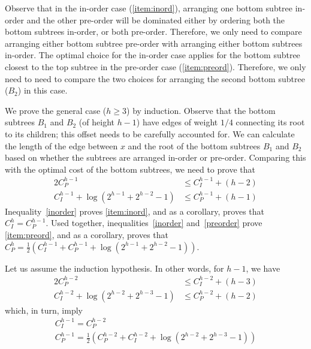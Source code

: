 \documentclass[10pt,conference,letterpaper]{IEEEtran}
\newcommand{\note}[1]{}
\begin{document}
\begin{IEEEproof}
Observe that in the in-order case (\autoref{item:inord}), arranging one bottom subtree in-order and the other pre-order will be dominated either by ordering both the bottom subtrees in-order, or both pre-order. Therefore, we only need to compare arranging either bottom subtree pre-order with arranging either bottom subtrees in-order. The optimal choice for the in-order case applies for the bottom subtree closest to the top subtree in the pre-order case (\autoref{item:preord}). Therefore, we only need to need to compare the two choices for arranging the second bottom subtree ($B_2$) in this case.

\note{I just moved this paragraph ``To prove...'', which wasn't useful in the main text.  Need to work it in somewhere. Worked in at top of the proof}

We prove the general case ($h \geq 3$) by induction. Observe that the bottom subtrees $B_1$ and $B_2$ (of height $h-1$) have edges of weight $1/4$ connecting its root to its children; this offset needs to be carefully accounted for. We can calculate the length of the edge between $x$ and the root of the bottom subtrees $B_1$ and $B_2$ based on whether the subtrees are arranged in-order or pre-order. Comparing this with the optimal cost of the bottom subtrees, we need to prove that
\begin{alignat}{2}
\label{inorder}
C_P^{h-1} & \leq C_I^{h-1} + (h-2)\\
\label{preorder}
C_I^{h-1} + \log(2^{h-1}+2^{h-2}-1) & \leq C_P^{h-1} + (h-1)\end{alignat}
Inequality~\eqref{inorder} proves \autoref{item:inord}, and as a corollary, proves that $C_I^{h} = C_P^{h-1}$. Used together, inequalities~\eqref{inorder} and~\eqref{preorder} prove \autoref{item:preord}, and as a corollary, proves that $C_P^{h} = \frac{1}{2} (C_I^{h-1} + C_P^{h-1} + \log(2^{h-1}+2^{h-2}-1))$. 


Let us assume the induction hypothesis. In other words, for $h-1$, we have
\begin{alignat}{2}
\label{e:inorder}
C_P^{h-2} & \leq C_I^{h-2} + (h-3) \\
\label{e:preorder}
C_I^{h-2} + \log(2^{h-2}+2^{h-3}-1) & \leq C_P^{h-2} + (h-2)\end{alignat}
which, in turn, imply
\begin{align}
\label{p:inorder}
C_I^{h-1} = C_P^{h-2}\\
\label{p:preorder}
C_P^{h-1} = \frac{1}{2} (C_P^{h-2} + C_I^{h-2} + \log(2^{h-2}+2^{h-3}-1))
\end{align}


\end{IEEEproof}
\end{document}

